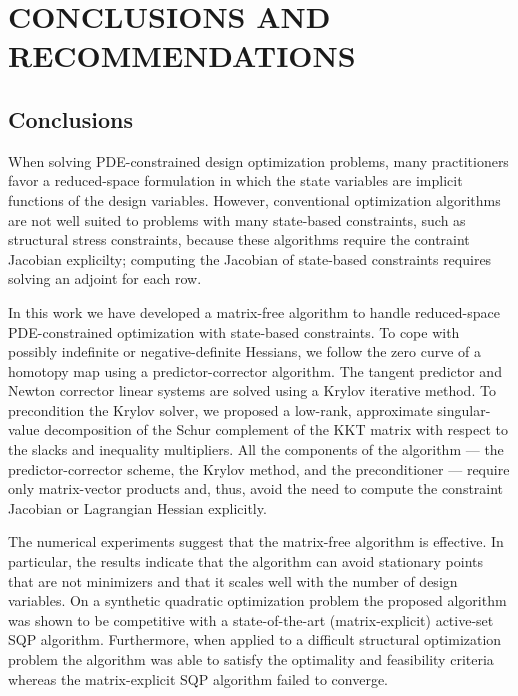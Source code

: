  
\chapter{CONCLUSIONS AND RECOMMENDATIONS}\label{chap:con}

\section{Conclusions}
When solving PDE-constrained design optimization problems, many practitioners
favor a reduced-space formulation in which the state variables are implicit
functions of the design variables.  However, conventional optimization 
algorithms are not well suited to problems with many state-based constraints, 
such as structural stress constraints, 
because these algorithms require the contraint Jacobian explicilty; 
computing the Jacobian of state-based constraints requires solving an adjoint for each row.
 
In this work we have developed a matrix-free algorithm to handle reduced-space
PDE-constrained optimization with state-based constraints.  To cope with
possibly indefinite or negative-definite Hessians, we follow the zero curve of a homotopy map using a
predictor-corrector algorithm.  The tangent predictor and Newton corrector linear systems are
solved using a Krylov iterative method.  To precondition the Krylov solver, we
proposed a low-rank, approximate singular-value decomposition of the Schur
complement of the KKT matrix with respect to the slacks and inequality multipliers.  All
the components of the algorithm --- the predictor-corrector scheme, the Krylov
method, and the preconditioner --- require only matrix-vector products and,
thus, avoid the need to compute the constraint Jacobian or Lagrangian Hessian
explicitly.

The numerical experiments suggest that the matrix-free algorithm is effective.
In particular, the results indicate that the algorithm can avoid stationary
points that are not minimizers and that it scales well with the number of design
variables.  On a synthetic quadratic optimization problem the proposed algorithm
was shown to be competitive with a state-of-the-art (matrix-explicit) active-set
SQP algorithm.  Furthermore, when applied to a difficult structural optimization
problem the algorithm was able to satisfy the optimality and feasibility
criteria whereas the matrix-explicit SQP algorithm failed to converge. 

